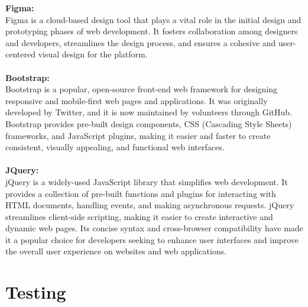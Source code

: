 \textbf{Figma:}\\
Figma is a cloud-based design tool that plays a vital role in the initial design and prototyping phases of web development. It fosters collaboration among designers and developers, streamlines the design process, and ensures a cohesive and user-centered visual design for the platform.\\\\
\newpage
\textbf{Bootstrap:}\\
Bootstrap is a popular, open-source front-end web framework for designing responsive and mobile-first web pages and applications. It was originally developed by Twitter, and it is now maintained by volunteers through GitHub. Bootstrap provides pre-built design components, CSS (Cascading Style Sheets) frameworks, and JavaScript plugins, making it easier and faster to create consistent, visually appealing, and functional web interfaces.\\\\
\textbf{JQuery:}\\
jQuery is a widely-used JavaScript library that simplifies web development. It provides a collection of pre-built functions and plugins for interacting with HTML documents, handling events, and making asynchronous requests. jQuery streamlines client-side scripting, making it easier to create interactive and dynamic web pages. Its concise syntax and cross-browser compatibility have made it a popular choice for developers seeking to enhance user interfaces and improve the overall user experience on websites and web applications.
\newpage
 \section{Testing}
